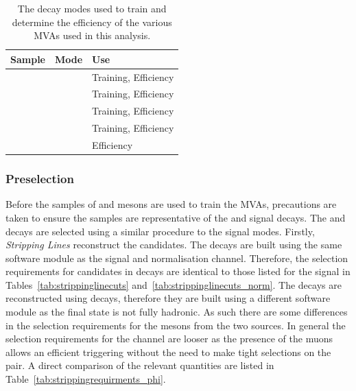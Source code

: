 \begin{table}[h]
\begin{center}
\begin{tabular}{lll}
   \hline
   Sample                    & Mode                       & Use \\ 
   \hline
   \decay{\Bsb}{\Dsp\pim}    & \decay{\Dsp}{\Kp\Km\pip}   & Training, Efficiency \\
   \decay{\Bsb}{\Dsp\pim}    & \decay{\Dsp}{\Kp\pim\pip}  & Training, Efficiency \\
   \decay{\Bsb}{\Dsp\pim}    & \decay{\Dsp}{\pip\pim\pip} & Training, Efficiency \\
   \decay{\Bs}{\jpsi\phiz}   & \decay{\phiz}{\Kp\Km}      & Training, Efficiency \\
   \hline
   \decay{\Bp}{\Dzb\pip}     & \decay{\Dzb}{\Kp\Km}       & Efficiency          \\
   \hline
\end{tabular}
\end{center}
\caption{The decay modes used to train and determine the efficiency of the various MVAs used in this analysis.}
\label{tab:mva_modes}
\end{table}

\subsubsection{Preselection}

Before the samples of \Dsp and \phiz mesons are used to train the MVAs, precautions are taken to ensure the samples are representative of the \decay{\Bp}{\Dsp\phiz} and \decay{\Bp}{\Dsp\Kp\Km} signal decays. The \decay{\Bsb}{\Dsp\pim} and \decay{\Bs}{\jpsi\phiz} decays are selected using a similar procedure to the signal modes. Firstly, \emph{Stripping Lines} reconstruct the candidates. The \decay{\Bsb}{\Dsp\pim} decays are built using the same software module as the signal and normalisation channel. Therefore, the selection requirements for \Dsp candidates in \decay{\Bsb}{\Dsp\pim} decays are identical to those listed for the signal in Tables~\ref{tab:strippinglinecuts} and~\ref{tab:strippinglinecuts_norm}.
The \decay{\Bs}{\jpsi\phiz} decays are reconstructed using \decay{\jpsi}{\mup\mun} decays, therefore they are built using a different software module as the final state is not fully hadronic. As such there are some differences in the selection requirements for the \phiz mesons from the two sources. In general the selection requirements for the \decay{\Bs}{\jpsi\phiz} channel are looser as the presence of the muons allows an efficient triggering without the need to make tight selections on the \Kp\Km pair. A direct comparison of the relevant quantities are listed in Table~\ref{tab:strippingrequirments_phi}.

